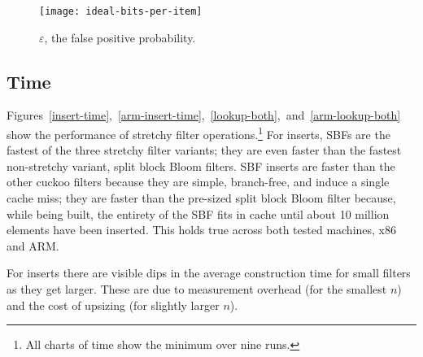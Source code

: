 \documentclass[letterpaper,twocolumn,10pt]{article}
\newcommand{\taffy}{stretchy}
\newcommand{\TBF}{SBF}
\newcommand{\TCF}{SCF}
\newcommand{\MTCF}{MSCF}
\newcommand{\taffy}{taffy}
\newcommand{\TBF}{TBF}
\newcommand{\TCF}{TCF}
\newcommand{\MTCF}{MTCF}
\begin{document}
\begin{figure}[b!]
  \texttt{[image: ideal-bits-per-item]}
  \caption{  \label{ideal-bits-per-item}
    $\varepsilon$, the false positive probability.
  }
\end{figure}





\subsection{Time}

Figures~\ref{insert-time},~\ref{arm-insert-time},~\ref{lookup-both},~and~\ref{arm-lookup-both} show the performance of \taffy{} filter operations.\footnote{All charts of time show the minimum over nine runs.}
For inserts, \TBF{}s are the fastest of the three \taffy{} filter variants; they are even faster than the fastest non-\taffy{} variant, split block Bloom filters.
\TBF{} inserts are faster than the other cuckoo filters because they are simple, branch-free, and induce a single cache miss; they are faster than the pre-sized split block Bloom filter because, while being built, the entirety of the \TBF{} fits in cache until about 10 million elements have been inserted.
This holds true across both tested machines, x86 and ARM.

For inserts there are visible dips in the average construction time for small filters as they get larger.
These are due to measurement overhead (for the smallest $n$) and the cost of upsizing (for slightly larger $n$).
\end{document}
